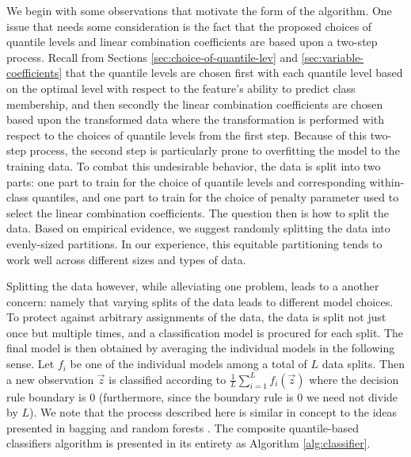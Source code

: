We begin with some observations that motivate the form of the algorithm.  One
issue that needs some consideration is the fact that the proposed choices of
quantile levels and linear combination coefficients are based upon a two-step
process.  Recall from Sections \ref{sec:choice-of-quantile-lev} and
\ref{sec:variable-coefficients} that the quantile levels are chosen first with
each quantile level based on the optimal level with respect to the feature's
ability to predict class membership, and then secondly the linear combination
coefficients are chosen based upon the transformed data where the transformation
is performed with respect to the choices of quantile levels from the first step.
Because of this two-step process, the second step is particularly prone to
overfitting the model to the training data.  To combat this undesirable
behavior, the data is split into two parts: one part to train for the choice of
quantile levels and corresponding within-class quantiles, and one part to train
for the choice of penalty parameter used to select the linear combination
coefficients.  The question then is how to split the data.  Based on empirical
evidence, we suggest randomly splitting the data into evenly-sized partitions.
In our experience, this equitable partitioning tends to work well across
different sizes and types of data.

Splitting the data however, while alleviating one problem, leads to a another
concern: namely that varying splits of the data leads to different model
choices.  To protect against arbitrary assignments of the data, the data is
split not just once but multiple times, and a classification model is procured
for each split.  The final model is then obtained by averaging the individual
models in the following sense.  Let $f_i$ be one of the individual models among
a total of $L$ data splits.  Then a new observation $\vec{z}$ is classified
according to $\frac{1}{L} \sum_{i=1}^L f_i(\vec{z})$ where the decision rule
boundary is 0 (furthermore, since the boundary rule is 0 we need not divide by
$L$).  We note that the process described here is similar in concept to the
ideas presented in bagging \cite{breiman1996} and random forests
\cite{breiman2001}.  The composite quantile-based classifiers algorithm is
presented in its entirety as Algorithm \ref{alg:classifier}.


  
